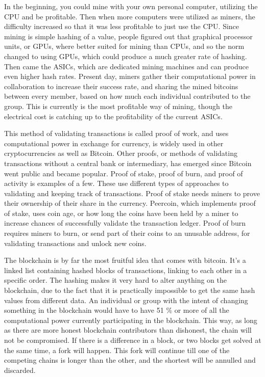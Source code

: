 \documentclass[11pt]{article}
\begin{document}
In the beginning, you could mine with your own personal computer, utilizing the CPU and be profitable. Then when more computers were utilized as miners, the difficulty increased so that it was less profitable to just use the CPU. Since mining is  simple hashing of a value, people figured out that graphical processor units, or GPUs, where better suited for mining than CPUs, and so the norm changed to using GPUs, which could produce a much greater rate of hashing. Then came the ASICs, which are dedicated mining machines and can produce even higher hash rates. Present day, miners gather their computational power in collaboration to increase their success rate, and sharing the mined bitcoins between every member, based on how much each individual contributed to the group. This is currently is the most profitable way of mining, though the electrical cost is catching up to the profitability of the current ASICs.

This method of validating transactions is called proof of work, and uses computational power in exchange for currency, is widely used in other cryptocurrencies as well as Bitcoin. Other proofs, or methods of validating transactions without a central bank or intermediary, has emerged since Bitcoin went public and became popular. Proof of stake, proof of burn, and proof of activity is examples of a few. These use different  types of approaches to validating and keeping track of transactions. Proof of stake needs miners to prove their ownership of their share in the currency. Peercoin, which implements proof of stake, uses coin age, or how long the coins have been held by a miner to increase chances of successfully validate the transaction ledger. Proof of burn requires miners to burn, or send part of their coins to an unusable address, for validating transactions and unlock new coins. 

The blockchain is by far the most fruitful idea that comes with bitcoin. It's a linked list containing hashed blocks of transactions, linking to each other in a specific order. The hashing makes it very hard to alter anything on the blockchain, due to the fact that it is practically impossible to get the same hash values from different data. An individual or group with the intent of changing something in the blockchain would have to have 51 \% or more of all the computational power currently participating in the blockchain. This way, as long as there are more honest blockchain contributors than dishonest, the chain will not be compromised. If there is a difference in a block, or two blocks get solved at the same time, a fork will happen. This fork will continue till one of the competing chains is longer than the other, and the shortest will be annulled and discarded. 
\end{document}
